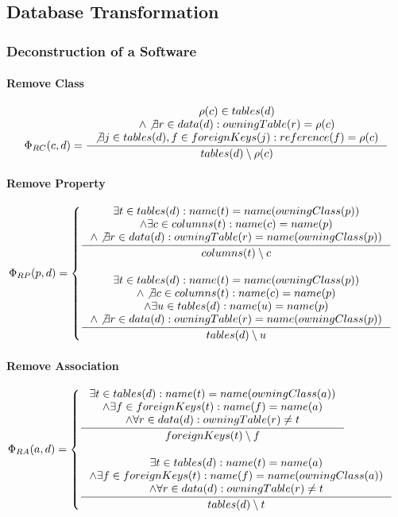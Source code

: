 \documentclass[11pt]{article}
\begin{document}
\subsection{Database Transformation}

\subsubsection{Deconstruction of a Software}
\paragraph{Remove Class}
$$
\Phi_{RC}(c,d) = \inference{ \rho(c) \in tables(d) \\ \wedge \not \exists r \in data(d) : owningTable(r) = \rho(c) \\ \not \exists j \in tables(d), f \in foreignKeys(j) : reference(f) = \rho(c)  }{ tables(d) \setminus \rho(c)}
$$

\paragraph{Remove Property}
$$
\Phi_{RP}(p, d) = \begin{cases}
 \inference{ \exists t \in tables(d) : name(t) = name(owningClass(p)) \\ \wedge \exists c \in columns(t) : name(c) = name(p) \\ \wedge \not \exists r \in data(d) : owningTable(r) = name(owningClass(p)) }{columns(t) \setminus c
} \\ \\
  \inference{ \exists t \in tables(d) : name(t) = name(owningClass(p)) \\ \wedge \not \exists c \in columns(t) : name(c) = name(p) \\ \wedge \exists u \in tables(d) : name(u) = name(p) \\ \wedge \not \exists r \in data(d) : owningTable(r) = name(owningClass(p))}{ tables(d) \setminus u }
 \end{cases}
$$

\paragraph{Remove Association}
$$
\Phi_{RA}(a, d) =  \begin{cases}
 \inference{\exists t \in tables(d) : name(t) = name(owningClass(a))
 \\ \wedge \exists f \in foreignKeys(t) : name(f) = name(a)
 \\ \wedge \forall r \in data(d) : owningTable(r) \neq t}{ foreignKeys(t) \setminus f }
 \\ \\
 \inference{\exists t \in tables(d) : name(t) = name(a)
 \\ \wedge \exists f \in foreignKeys(t) : name(f) = name(owningClass(a))
 \\ \wedge \forall r \in data(d) : owningTable(r) \neq t}{ tables(d) \setminus t}
 \end{cases}
$$
\end{document}
